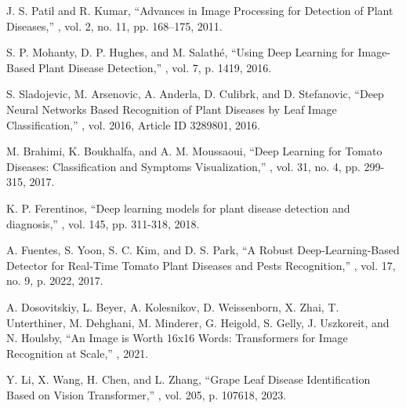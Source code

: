 \documentclass[preprint,12pt]{elsarticle}
\begin{document}
\begingroup
\footnotesize
{}  %


\begin{thebibliography}{99}

J. S. Patil and R. Kumar,
\newblock ``Advances in Image Processing for Detection of Plant Diseases,''
, vol. 2, no. 11, pp. 168–175, 2011.

S. P. Mohanty, D. P. Hughes, and M. Salathé,
\newblock ``Using Deep Learning for Image-Based Plant Disease Detection,''
, vol. 7, p. 1419, 2016.

S. Sladojevic, M. Arsenovic, A. Anderla, D. Culibrk, and D. Stefanovic,
\newblock ``Deep Neural Networks Based Recognition of Plant Diseases by Leaf Image Classification,''
, vol. 2016, Article ID 3289801, 2016.

M. Brahimi, K. Boukhalfa, and A. M. Moussaoui,
\newblock ``Deep Learning for Tomato Diseases: Classification and Symptoms Visualization,''
, vol. 31, no. 4, pp. 299-315, 2017.

K. P. Ferentinos,
\newblock ``Deep learning models for plant disease detection and diagnosis,''
, vol. 145, pp. 311-318, 2018.

A. Fuentes, S. Yoon, S. C. Kim, and D. S. Park,
\newblock ``A Robust Deep-Learning-Based Detector for Real-Time Tomato Plant Diseases and Pests Recognition,''
, vol. 17, no. 9, p. 2022, 2017.

A. Dosovitskiy, L. Beyer, A. Kolesnikov, D. Weissenborn, X. Zhai, T. Unterthiner, M. Dehghani, M. Minderer, G. Heigold, S. Gelly, J. Uszkoreit, and N. Houlsby,
\newblock ``An Image is Worth 16x16 Words: Transformers for Image Recognition at Scale,''
, 2021.

Y. Li, X. Wang, H. Chen, and L. Zhang,
\newblock ``Grape Leaf Disease Identification Based on Vision Transformer,''
, vol. 205, p. 107618, 2023.


\end{thebibliography}
\end{document}
